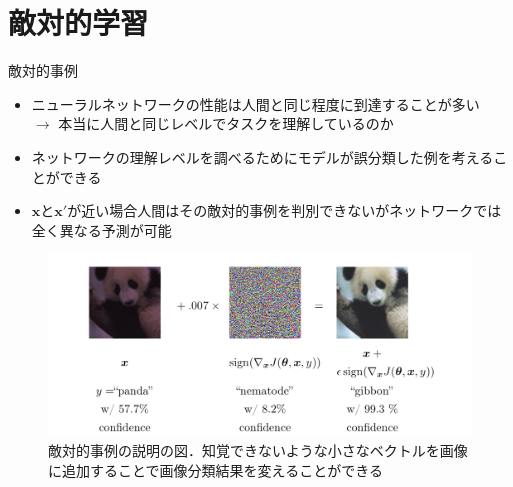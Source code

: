 \documentclass[dvipdfmx, 10pt]{beamer}
\begin{document}

\section{敵対的学習}


\begin{frame}{敵対的事例}
  \begin{itemize}
    \item ニューラルネットワークの性能は人間と同じ程度に到達することが多い\\
    $\rightarrow$ 本当に人間と同じレベルでタスクを理解しているのか
    \item ネットワークの理解レベルを調べるためにモデルが誤分類した例を考えることができる
    \item $\bm{x}$と$\bm{x}'$が近い場合人間はその\alert{敵対的事例}を判別できないがネットワークでは全く異なる予測が可能
  \end{itemize}
  \begin{figure}[htbp]
    \centering
    \includegraphics[keepaspectratio, scale=0.30]{./images/vae.png}
  \caption{敵対的事例の説明の図．知覚できないような小さなベクトルを画像に追加することで画像分類結果を変えることができる}
  \end{figure}
\end{frame}

\end{document}
